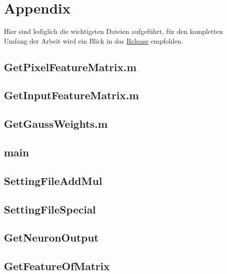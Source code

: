 \newpage
\section{Appendix}\label{Appendix}
Hier sind lediglich die wichtigsten Dateien aufgeführt, für den kompletten Umfang der Arbeit wird ein Blick in das \href{https://github.com/TonightsCoding/MachineLearning/releases/tag/v1.0.0}{Release} empfohlen.
\subsection{GetPixelFeatureMatrix.m}\label{GetPixelFeatureMatrix}

\subsection{GetInputFeatureMatrix.m}\label{GetInputFeatureMatrix}

\newpage
\subsection{GetGaussWeights.m}\label{GetGaussWeights}

\newpage
\subsection{main}\label{main}

\newpage
\subsection{SettingFileAddMul}\label{SettingFileAddMul}

\newpage
\subsection{SettingFileSpecial}\label{SettingFileSpecial}

\newpage
\subsection{GetNeuronOutput}\label{GetNeuronOutput}

\newpage
\subsection{GetFeatureOfMatrix}\label{GetFeatureOfMatrix}

